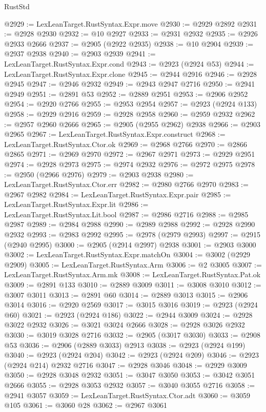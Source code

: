 \begin{lexlean}{RustStd}
\begin{coremodule}
@2929 := LexLeanTarget.RustSyntax.Expr.move
@2930 := @2929 @2892
@2931 := @2928 @2930
@2932 := @10 @2927
@2933 := @2931 @2932
@2935 := @2926 @2933 @2666
@2937 := @2905 (@2922 @2935)
@2938 := @10 @2904
@2939 := @2937 @2938
@2940 := @2903 @2939
@2941 := LexLeanTarget.RustSyntax.Expr.cond
@2943 := @2923 (@2924 @53)
@2944 := LexLeanTarget.RustSyntax.Expr.clone
@2945 := @2944 @2916
@2946 := @2928 @2945
@2947 := @2946 @2932
@2949 := @2943 @2947 @2716
@2950 := @2941 @2949
@2951 := @2891 @53
@2952 := @2889 @2951
@2953 := @2906 @2952
@2954 := @2920 @2766
@2955 := @2953 @2954
@2957 := @2923 (@2924 @133)
@2958 := @2929 @2916
@2959 := @2928 @2958
@2960 := @2959 @2932
@2962 := @2957 @2960 @2666
@2965 := @2905 (@2955 @2962) @2938
@2966 := @2903 @2965
@2967 := LexLeanTarget.RustSyntax.Expr.construct
@2968 := LexLeanTarget.RustSyntax.Ctor.ok
@2969 := @2968 @2766
@2970 := @2866 @2865
@2971 := @2969 @2970
@2972 := @2967 @2971
@2973 := @2929 @2951
@2974 := @2928 @2973
@2975 := @2974 @2932
@2976 := @2972 @2975
@2978 := @2950 (@2966 @2976)
@2979 := @2903 @2938
@2980 := LexLeanTarget.RustSyntax.Ctor.err
@2982 := @2980 @2766 @2970
@2983 := @2967 @2982
@2984 := LexLeanTarget.RustSyntax.Expr.pair
@2985 := LexLeanTarget.RustSyntax.Expr.lit
@2986 := LexLeanTarget.RustSyntax.Lit.bool
@2987 := @2986 @2716
@2988 := @2985 @2987
@2989 := @2984 @2988
@2990 := @2989 @2988
@2992 := @2928 @2990 @2932
@2993 := @2983 @2992
@2995 := @2978 (@2979 @2993)
@2997 := @2915 (@2940 @2995)
@3000 := @2905 (@2914 @2997) @2938
@3001 := @2903 @3000
@3002 := LexLeanTarget.RustSyntax.Expr.matchOn
@3004 := @3002 (@2929 @2909)
@3005 := LexLeanTarget.RustSyntax.Arm
@3006 := @2 @3005
@3007 := LexLeanTarget.RustSyntax.Arm.mk
@3008 := LexLeanTarget.RustSyntax.Pat.ok
@3009 := @2891 @133
@3010 := @2889 @3009
@3011 := @3008 @3010
@3012 := @3007 @3011
@3013 := @2891 @60
@3014 := @2889 @3013
@3015 := @2906 @3014
@3016 := @2920 @2569
@3017 := @3015 @3016
@3019 := @2923 (@2924 @60)
@3021 := @2923 (@2924 @186)
@3022 := @2944 @3009
@3024 := @2928 @3022 @2932
@3026 := @3021 @3024 @2666
@3028 := @2928 @3026 @2932
@3030 := @3019 @3028 @2716
@3032 := @2905 (@3017 @3030)
@3033 := @2908 @53
@3036 := @2906 (@2889 @3033) @2913
@3038 := @2923 (@2924 @199)
@3040 := @2923 (@2924 @204)
@3042 := @2923 (@2924 @209)
@3046 := @2923 (@2924 @214) @2932 @2716
@3047 := @2928 @3046
@3048 := @2929 @3009
@3050 := @2928 @3048 @2932
@3051 := @3047 @3050
@3053 := @3042 @3051 @2666
@3055 := @2928 @3053 @2932
@3057 := @3040 @3055 @2716
@3058 := @2941 @3057
@3059 := LexLeanTarget.RustSyntax.Ctor.adt
@3060 := @3059 @105
@3061 := @3060 @28
@3062 := @2967 @3061

\end{coremodule}
\end{lexlean}
